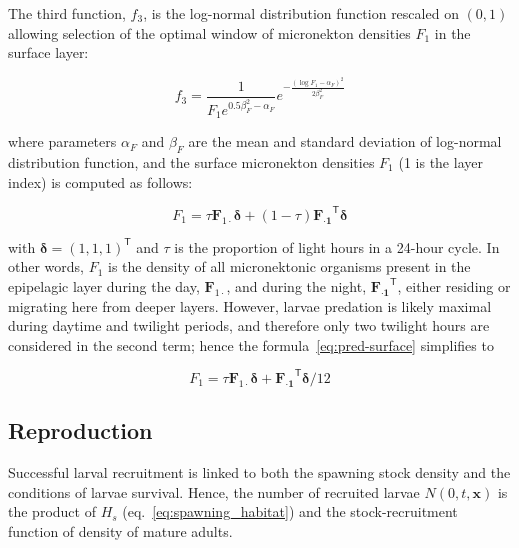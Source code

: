 The third function, $f_3$, is the log-normal distribution function rescaled on $(0,1)$ allowing selection of the optimal window of micronekton densities $F_1$ in the surface layer:

\begin{equation}
f_3 = \frac{1}{F_1 e^{0.5\beta^2_F-\alpha_F}} e^{-\frac{\left(\log{F_1}-{\alpha_F}\right)^2}{2\beta^2_F}}
\label{eq:spawning-pred}
\end{equation}

\noindent where parameters $\alpha_F$ and $\beta_F$ are the mean and standard deviation of log-normal distribution function, and the surface micronekton densities $F_1$ (1 is the layer index) is computed as follows: 

\begin{equation}
F_1 = \tau {\mathbf F_{1 \cdot}}{\mathbf \delta} +(1-\tau) {\mathbf {F_{\cdot 1}}^{\mathsf{T}}} {\mathbf \delta}
\label{eq:pred-surface}
\end{equation}

\noindent with $\mathbf{\delta}=(1,1,1)^{\mathsf{T}}$ and $\tau$ is the proportion of light hours in a 24-hour cycle. In other words, $F_1$ is the density of all micronektonic organisms present in the epipelagic layer during the day, ${\mathbf F_{1 \cdot}}$, and during the night, ${\mathbf {F_{\cdot 1}}^{\mathsf{T}}}$, either residing or migrating here from deeper layers. However, larvae predation is likely maximal during daytime and twilight periods, and therefore only two twilight hours are considered in the second term; hence the formula~\ref{eq:pred-surface} simplifies to 

\begin{equation}
F_1 = \tau {\mathbf F_{1 \cdot}}{\mathbf \delta} + {\mathbf {F_{\cdot 1}}^{\mathsf{T}}} {\mathbf \delta}/12
\label{eq:pred-surface2}
\end{equation}


\subsection{Reproduction}\label{sec:reproduction}
Successful larval recruitment is linked to both the spawning stock density and the conditions of larvae survival. Hence, the number of recruited larvae $N(0,t,\mathbf{x})$ is the product of $H_s$ (eq.~\ref{eq:spawning_habitat})  and the stock-recruitment function of density of mature adults.

